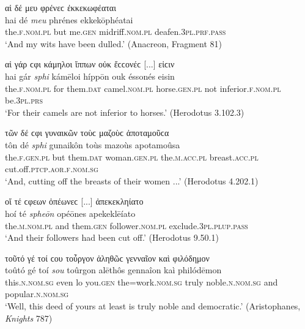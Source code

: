 \begin{exe}
\ex αἱ δέ μευ φρένεϲ ἐκκεκωφέαται\\
\gll hai dé \emph{meu} phrénes ekkekōphéatai\\
the.\textsc{f.nom.pl} but me.\textsc{gen} midriff.\textsc{nom.pl}
deafen.\textsc{3pl.prf.pass}\\
\trans `And my wits have been dulled.' (Anacreon, Fragment 81)
\label{part2}
\end{exe}

\begin{exe}
\ex αἱ γάρ ϲφι κάμηλοι ἵππων οὐκ ἔϲϲονέϲ {[}...{]} εἰϲιν\\
\gll hai gár \emph{sphi} kámēloi híppōn ouk éssonés eisin\\
the.\textsc{f.nom.pl} for them.\textsc{dat} camel.\textsc{nom.pl}
horse.\textsc{gen.pl} not inferior.\textsc{f.nom.pl} be.\textsc{3pl.prs}\\
\trans `For their camels are not inferior to horses.' (Herodotus 3.102.3)
\label{part3}
\end{exe}

\begin{exe}
\ex τῶν δέ ϲφι γυναικῶν τοὺϲ μαζοὺϲ ἀποταμοῦϲα\\
\gll tôn dé \emph{sphi} gunaikôn toùs mazoùs apotamoûsa\\
the.\textsc{f.gen.pl} but them.\textsc{dat} woman.\textsc{gen.pl}
the.\textsc{m.acc.pl} breast.\textsc{acc.pl} cut.off.\textsc{ptcp.aor.f.nom.sg}\\
\trans `And, cutting off the breasts of their women ...' (Herodotus 4.202.1)
\label{part4}
\end{exe}

\begin{exe}
\ex οἵ τέ ϲφεων ὀπέωνεϲ {[}...{]} ἀπεκεκληίατο\\
\gll hoí té \emph{spheōn} opéōnes apekeklēíato\\
the.\textsc{m.nom.pl} and them.\textsc{gen} follower.\textsc{nom.pl}
exclude.\textsc{3pl.plup.pass}\\
\trans `And their followers had been cut off.' (Herodotus 9.50.1)
\label{part5}
\end{exe}

\begin{exe}
\ex τοῦτό γέ τοί ϲου τοὖργον ἀληθῶϲ γενναῖον καὶ φιλόδημον\\
\gll toûtó gé toí \emph{sou} toûrgon alēthôs gennaîon kaì philódēmon\\
this.\textsc{n.nom.sg} even lo you.\textsc{gen} the=work.\textsc{nom.sg} truly noble.\textsc{n.nom.sg} and popular.\textsc{n.nom.sg}\\
\trans `Well, this deed of yours at least is truly noble and democratic.' (Aristophanes, \textit{Knights} 787)
\label{part6}
\end{exe}

